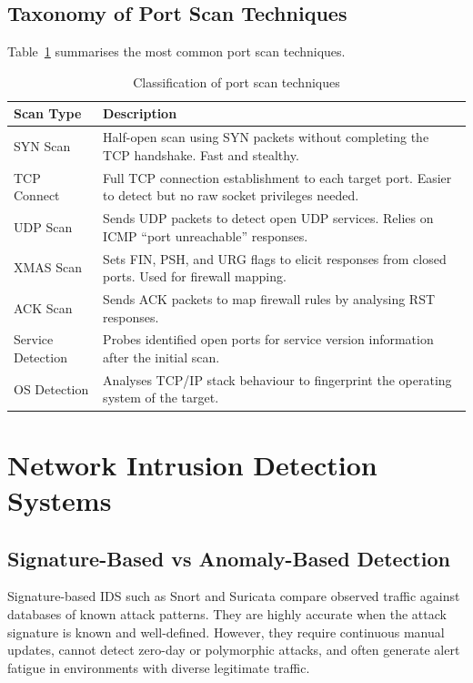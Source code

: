 \documentclass[12pt,a4paper]{report}
\begin{document}
\subsection{Taxonomy of Port Scan Techniques}

Table~\ref{tab:scan_taxonomy} summarises the most common port scan techniques.

\begin{table}[H]
\centering
\caption{Classification of port scan techniques}
\label{tab:scan_taxonomy}
\begin{tabularx}{\textwidth}{lX}
\toprule
\textbf{Scan Type} & \textbf{Description} \\
\midrule
SYN Scan & Half-open scan using SYN packets without completing the TCP handshake. Fast and stealthy. \\
TCP Connect & Full TCP connection establishment to each target port. Easier to detect but no raw socket privileges needed. \\
UDP Scan & Sends UDP packets to detect open UDP services. Relies on ICMP ``port unreachable'' responses. \\
XMAS Scan & Sets FIN, PSH, and URG flags to elicit responses from closed ports. Used for firewall mapping. \\
ACK Scan & Sends ACK packets to map firewall rules by analysing RST responses. \\
Service Detection & Probes identified open ports for service version information after the initial scan. \\
OS Detection & Analyses TCP/IP stack behaviour to fingerprint the operating system of the target. \\
\bottomrule
\end{tabularx}
\end{table}

\section{Network Intrusion Detection Systems}

\subsection{Signature-Based vs Anomaly-Based Detection}

Signature-based IDS such as Snort and Suricata compare observed traffic against databases of known attack patterns. They are highly accurate when the attack signature is known and well-defined. However, they require continuous manual updates, cannot detect zero-day or polymorphic attacks, and often generate alert fatigue in environments with diverse legitimate traffic.
\end{document}

